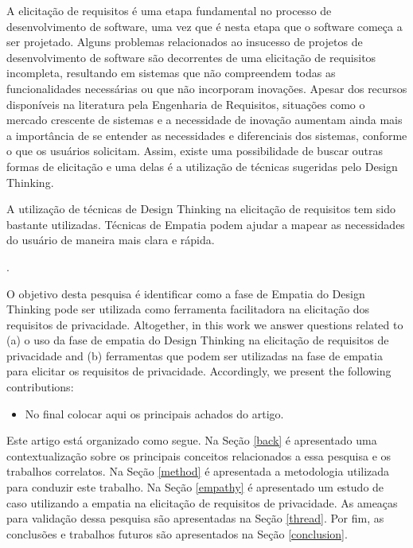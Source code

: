 \documentclass[conference]{IEEEtran}
\begin{document}
A elicitação de requisitos é uma etapa fundamental no processo de desenvolvimento de software, uma vez que é nesta etapa que o software começa a ser projetado. Alguns problemas relacionados ao insucesso de projetos de desenvolvimento de software são decorrentes de uma elicitação de requisitos incompleta, resultando em sistemas que não compreendem todas as funcionalidades necessárias ou que não incorporam inovações. Apesar dos recursos disponíveis na literatura pela Engenharia de Requisitos, situações como o mercado crescente de
sistemas e a necessidade de inovação aumentam ainda mais a importância de se entender as necessidades e diferenciais dos sistemas, conforme o que os usuários solicitam. Assim, existe uma possibilidade de buscar outras formas de elicitação e uma delas é a utilização de técnicas sugeridas pelo Design Thinking.

A utilização de técnicas de Design Thinking na elicitação de requisitos tem sido bastante utilizadas. Técnicas de Empatia podem ajudar a mapear as necessidades do usuário de maneira mais clara e rápida.



.

O objetivo desta pesquisa é identificar como a fase de Empatia do Design Thinking pode ser utilizada como ferramenta facilitadora na elicitação dos requisitos de privacidade. Altogether, in this work we answer questions related to (a) o uso da fase de empatia do Design Thinking na elicitação de requisitos de privacidade and (b) ferramentas que podem ser utilizadas na fase de empatia para elicitar os requisitos de privacidade. Accordingly, we present the following contributions:

\begin{itemize}
    \item No final colocar aqui os principais achados do artigo.
\end{itemize}

Este artigo está organizado como segue. Na Seção \ref{back} é apresentado uma contextualização sobre os principais conceitos relacionados a essa pesquisa e os trabalhos correlatos. Na Seção \ref{method} é apresentada a metodologia utilizada para conduzir este trabalho. Na Seção \ref{empathy} é apresentado um estudo de caso utilizando a empatia na elicitação de requisitos de privacidade. As ameaças para validação dessa pesquisa são apresentadas na Seção \ref{thread}. Por fim, as conclusões e trabalhos futuros são apresentados na Seção \ref{conclusion}.
\end{document}

